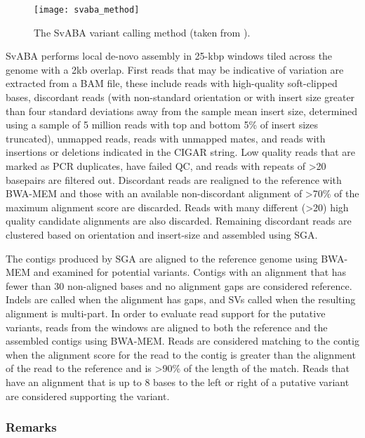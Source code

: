 \begin{figure}[H]
    \texttt{[image: svaba\_method]}
    \centering
    \caption {The SvABA variant calling method (taken from \autocite{wala2018svaba}).}
    \label{fig:svaba_method}
\end{figure}

SvABA performs local de-novo assembly in 25-kbp windows tiled across the genome with a 2kb overlap. First reads that may be indicative of variation are extracted from a BAM file, these include reads with high-quality soft-clipped bases, discordant reads (with non-standard orientation or with insert size greater than four standard deviations away from the sample mean insert size, determined using a sample of 5 million reads with top and bottom 5\% of insert sizes truncated), unmapped reads, reads with unmapped mates, and reads with insertions or deletions indicated in the CIGAR string. Low quality reads that are marked as PCR duplicates, have failed QC, and reads with repeats of >20 basepairs are filtered out. Discordant reads are realigned to the reference with BWA-MEM and those with an available non-discordant alignment of >70\% of the maximum alignment score are discarded. Reads with many different (>20) high quality candidate alignments are also discarded. Remaining discordant reads are clustered based on orientation and insert-size and assembled using SGA.

The contigs produced by SGA are aligned to the reference genome using BWA-MEM and examined for potential variants. Contigs with an alignment that has fewer than 30 non-aligned bases and no alignment gaps are considered reference. Indels are called when the alignment has gaps, and SVs called when the resulting alignment is multi-part. In order to evaluate read support for the putative variants, reads from the windows are aligned to both the reference and the assembled contigs using BWA-MEM. Reads are considered matching to the contig when the alignment score for the read to the contig is greater than the alignment of the read to the reference and is >90\% of the length of the match. Reads that have an alignment that is up to 8 bases to the left or right of a putative variant are considered supporting the variant.

\subsubsection{Remarks}

